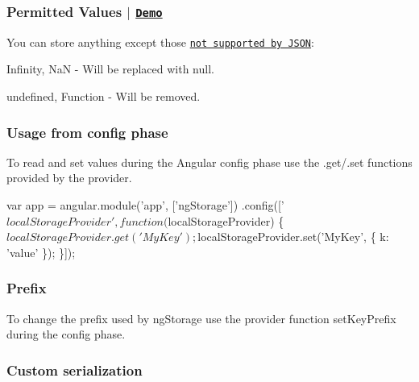 \subsubsection*{Permitted Values $\vert$ \href{http://plnkr.co/edit/n0acYLdhk3AeZmPOGY9Z?p=preview}{\tt Demo}}

You can store anything except those \href{http://www.json.org/js.html}{\tt not supported by J\+S\+ON}\+:


\begin{DoxyItemize}
\item {\ttfamily Infinity}, {\ttfamily NaN} -\/ Will be replaced with {\ttfamily null}.
\item {\ttfamily undefined}, Function -\/ Will be removed.
\end{DoxyItemize}

\subsubsection*{Usage from config phase}

To read and set values during the Angular config phase use the {\ttfamily .get/.set} functions provided by the provider.


\begin{DoxyCode}
var app = angular.module('app', ['ngStorage'])
.config(['$localStorageProvider',
    function ($localStorageProvider) \{
        $localStorageProvider.get('MyKey');

        $localStorageProvider.set('MyKey', \{ k: 'value' \});
    \}]);
\end{DoxyCode}


\subsubsection*{Prefix}

To change the prefix used by ng\+Storage use the provider function {\ttfamily set\+Key\+Prefix} during the config phase.




\subsubsection*{Custom serialization}

